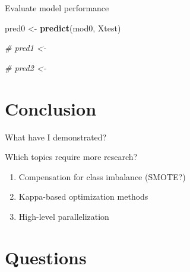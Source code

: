 \documentclass[ignorenonframetext,]{beamer}
\newenvironment{Shaded}{\begin{snugshade}}{\end{snugshade}}
\newcommand{\KeywordTok}[1]{\textcolor[rgb]{0.13,0.29,0.53}{\textbf{{#1}}}}
\newcommand{\StringTok}[1]{\textcolor[rgb]{0.31,0.60,0.02}{{#1}}}
\newcommand{\CommentTok}[1]{\textcolor[rgb]{0.56,0.35,0.01}{\textit{{#1}}}}
\newcommand{\NormalTok}[1]{{#1}}
\providecommand{\tightlist}{%
\setlength{\itemsep}{0pt}\setlength{\parskip}{0pt}}
\begin{document}
\begin{frame}[fragile]{Evaluate model performance}

\footnotesize

\begin{Shaded}
\begin{Highlighting}[]
\NormalTok{pred0 <-}\StringTok{ }\KeywordTok{predict}\NormalTok{(mod0, Xtest)}

\CommentTok{# pred1 <- }

\CommentTok{# pred2 <- }
\end{Highlighting}
\end{Shaded}

\end{frame}

\section{Conclusion}\label{conclusion}

\begin{frame}{What have I demonstrated?}

\end{frame}

\begin{frame}{Which topics require more research?}

\begin{enumerate}
\def\labelenumi{\arabic{enumi}.}
\tightlist
\item
  Compensation for class imbalance (SMOTE?)
\item
  Kappa-based optimization methods
\item
  High-level parallelization
\end{enumerate}

\end{frame}

\section{Questions}\label{questions}
\end{document}
